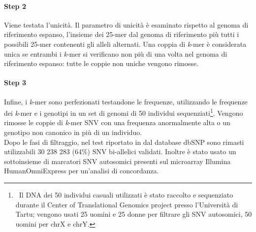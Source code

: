 \documentclass[../main.tex]{subfiles}
\begin{document}
\paragraph{Step 2} Viene testata l'unicità. Il parametro di unicità è esaminato rispetto al genoma di riferimento espanso, l'insieme dei 25-mer dal genoma di riferimento più tutti i possibili 25-mer contenenti gli alleli alternati. Una coppia di \textit{k}-mer è considerata unica se entrambi i \textit{k}-mer si verificano non più di una volta nel genoma di riferimento espanso: tutte le coppie non uniche vengono rimosse.

\paragraph{Step 3} Infine, i \textit{k}-mer sono perfezionati testandone le frequenze, utilizzando le frequenze dei \textit{k}-mer e i genotipi in un set di genomi di 50 individui sequenziati\footnote{\ Il DNA dei 50 individui casuali utilizzati è stato raccolto e sequenziato durante il Center of Translational Genomics project presso l'Università di Tartu; vengono usati 25 uomini e 25 donne per filtrare gli SNV autosomici, 50 uomini per chrX e chrY. }. Vengono rimosse le coppie di \textit{k}-mer SNV con una frequenza anormalmente alta o un genotipo non canonico in più di un individuo. \\

\noindent
Dopo le fasi di filtraggio, nel test riportato in \cite{pajuste2017fastgt} dal database dbSNP sono rimasti utilizzabili 30 238 283 (64\%) SNV bi-allelici validati. Inoltre è stato usato un sottoinsieme di marcatori SNV autosomici presenti sul microarray Illumina HumanOmniExpress per un'analisi di concordanza.  \\
\end{document}

